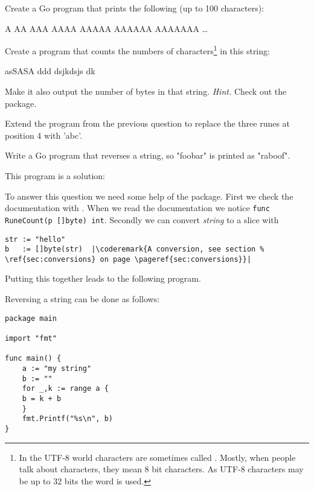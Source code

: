 \begin{Exercise}[title={Strings},difficulty=1]
\label{ex:strings}
\Question \label{ex:strings q1} Create a Go program that prints
the following (up to 100 characters):
\begin{display}
A
AA
AAA
AAAA
AAAAA
AAAAAA
AAAAAAA
\ldots
\end{display}


\Question \label{ex:strings q2} Create a program that counts
the numbers of characters\footnote{In the UTF-8 world characters are
sometimes called . Mostly, when people talk about characters, they
mean 8 bit characters. As UTF-8 characters may be up to 32 bits the word
 is used.}
in this string:
\begin{display}
asSASA ddd dsjkdsjs dk
\end{display}
Make it also output the number of bytes in that string.
\emph{Hint.} Check out the  package.

\Question \label{ex:string q3} Extend the program from
the previous question to replace the three runes at
position 4 with 'abc'.

\Question \label{ex:string q4} Write a Go program
that reverses a string, so "foobar" is printed as "raboof".

\end{Exercise}

\begin{Answer}

\Question This program is a solution:


\Question To answer this question we need some help of
the  package. First we check the documentation
with . When we read the documentation
we notice \lstinline{func RuneCount(p []byte) int}. Secondly
we can convert \emph{string} to a  slice with
\begin{lstlisting}
str := "hello"
b   := []byte(str)  |\coderemark{A conversion, see section %
\ref{sec:conversions} on page \pageref{sec:conversions}}|
\end{lstlisting}

Putting this together leads to the following program.


\Question Reversing a string can be done as follows:
\begin{lstlisting}
package main

import "fmt"

func main() {
    a := "my string"
    b := ""
    for _,k := range a {
	b = k + b
    }
    fmt.Printf("%s\n", b)
}
\end{lstlisting}

\end{Answer}
